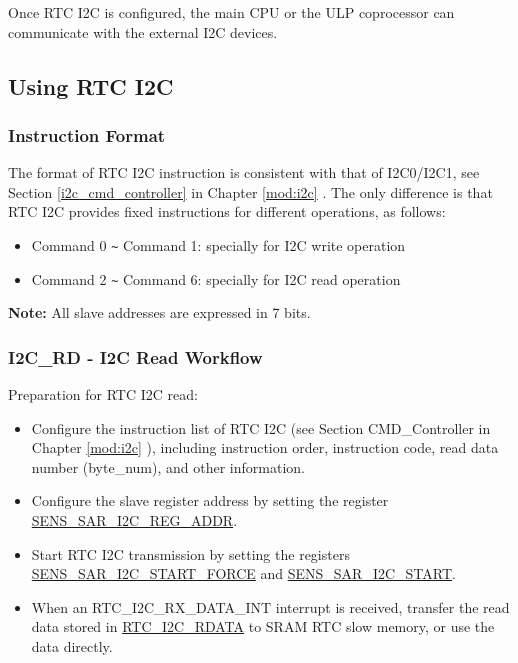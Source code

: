 \documentclass[main\_\_EN.tex]{subfiles}
\begin{document}
Once RTC I2C is configured, the main CPU or the ULP coprocessor can communicate with the external I2C devices.

\subsection{Using RTC I2C}
\subsubsection{Instruction Format}

The format of RTC I2C instruction is consistent with that of I2C0/I2C1, see Section \ref{i2c_cmd_controller} \textit{} in Chapter \ref{mod:i2c} \textit{}. The only difference is that RTC I2C provides fixed instructions for different operations, as follows:
\begin{itemize}
    \item Command 0 \verb+~+ Command 1: specially for I2C write operation
    \item Command 2 \verb+~+ Command 6: specially for I2C read operation
\end{itemize}

\textbf{Note:}
All slave addresses are expressed in 7 bits.


\subsubsection{I2C\_RD - I2C Read Workflow}

Preparation for RTC I2C read:

\begin{itemize}
    \item Configure the instruction list of RTC I2C (see Section CMD\_Controller in Chapter \ref{mod:i2c} \textit{}), including instruction order, instruction code, read data number (byte\_num), and other information.
    \item Configure the slave register address by setting the register \hyperref[fielddesc:SENSSARI2CREGADDR]{SENS\_SAR\_I2C\_REG\_ADDR}.
    \item Start RTC I2C transmission by setting the registers \hyperref[fielddesc:SENSSARI2CSTARTFORCE]{SENS\_SAR\_I2C\_START\_FORCE} and \hyperref[fielddesc:SENSSARI2CSTART]{SENS\_SAR\_I2C\_START}.
    \item When an RTC\_I2C\_RX\_DATA\_INT interrupt is received, transfer the read data stored in \hyperref[fielddesc:RTCI2CI2CRDATA]{RTC\_I2C\_RDATA} to SRAM RTC slow memory, or use the data directly.
\end{itemize}
\end{document}
